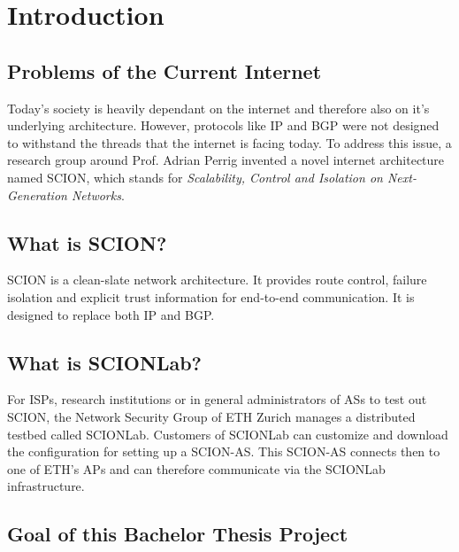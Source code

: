 \chapter{Introduction}

\section{Problems of the Current Internet}
Today's society is heavily dependant on the internet and therefore also on it's underlying architecture. However, protocols like \ac{IP} and \ac{BGP} were not designed to withstand the threads that the internet is facing today. To address this issue, a research group around Prof. Adrian Perrig invented a novel internet architecture named \ac{SCION}, which stands for \textit{Scalability, Control and Isolation on Next-Generation Networks}.

\section{What is SCION?}

\acs{SCION} is a clean-slate network architecture. It provides route control, failure isolation and explicit trust information for end-to-end communication\cite{scion2019website}. It is designed to replace both \acs{IP} and \acs{BGP}.

\section{What is SCIONLab?}

For \acp{ISP}, research institutions or in general administrators of \acp{AS} to test out \acs{SCION}, the Network Security Group of \acs{ETH} Zurich manages a distributed testbed called \acs{SCIONLab}. Customers of \acs{SCIONLab} can customize and download the configuration for setting up a \acs{SCION}-\ac{AS}. This \acs{SCION}-\ac{AS} connects then to one of \acs{ETH}'s \aclp{AP} and can therefore communicate  via the \acs{SCIONLab} infrastructure.

\section{Goal of this Bachelor Thesis Project}

